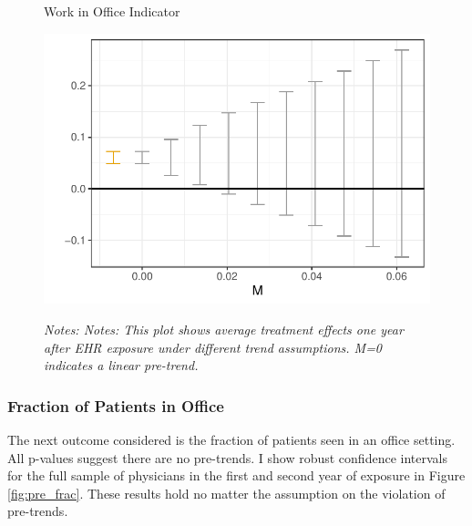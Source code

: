 \documentclass[12pt]{article}
\begin{document}
\begin{figure}[ht]
    \centering
    \captionsetup{width=.5\linewidth}
    \caption{Work in Office Indicator}
    \includegraphics[scale=.5]{Objects/office_ind_pretrends_plot.pdf}
    \label{fig:pre_work}
    \vspace{2mm}
    \caption*{\footnotesize{\textit{Notes: Notes: This plot shows average treatment effects one year after EHR exposure under different trend assumptions. M=0 indicates a linear pre-trend.}}}
\end{figure}

\subsubsection{Fraction of Patients in Office}

The next outcome considered is the fraction of patients seen in an office setting. All p-values suggest there are no pre-trends. I show robust confidence intervals for the full sample of physicians in the first and second year of exposure in Figure \ref{fig:pre_frac}. These results hold no matter the assumption on the violation of pre-trends. 
\end{document}
